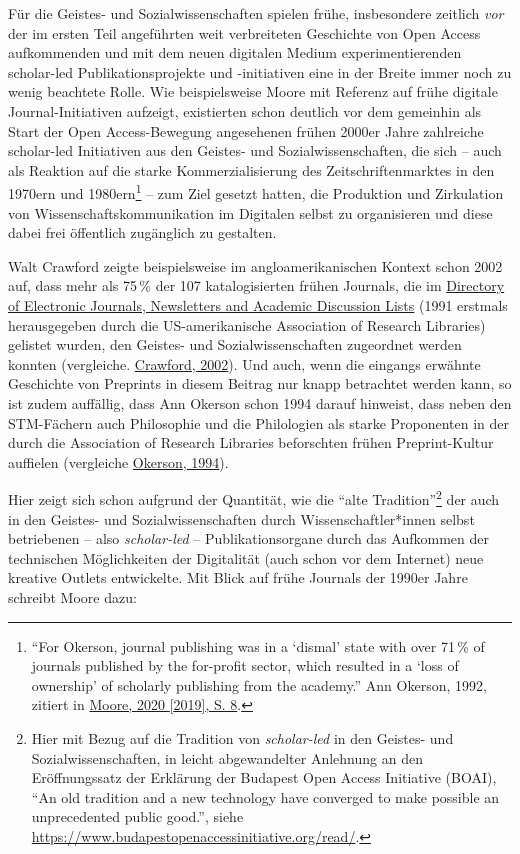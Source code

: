 \documentclass[a4paper,
fontsize=11pt,
oneside,
numbers=noperiodatend,
parskip=half-,
bibliography=totoc,
final
]{scrartcl}
\begin{document}
Für die Geistes- und Sozialwissenschaften spielen frühe, insbesondere
zeitlich \emph{vor} der im ersten Teil angeführten weit verbreiteten
Geschichte von Open Access aufkommenden und mit dem neuen digitalen
Medium experimentierenden scholar-led Publikationsprojekte und
-initiativen eine in der Breite immer noch zu wenig beachtete Rolle. Wie
beispielsweise Moore mit Referenz auf frühe digitale Journal-Initiativen
aufzeigt, existierten schon deutlich vor dem gemeinhin als Start der
Open Access-Bewegung angesehenen frühen 2000er Jahre zahlreiche
scholar-led Initiativen aus den Geistes- und Sozialwissenschaften, die
sich -- auch als Reaktion auf die starke Kommerzialisierung des
Zeitschriftenmarktes in den 1970ern und 1980ern\footnote{\enquote{For
  Okerson, journal publishing was in a \enquote*{dismal} state with over
  71\,\% of journals published by the for-profit sector, which resulted
  in a \enquote*{loss of ownership} of scholarly publishing from the
  academy.} Ann Okerson, 1992, zitiert in
  \href{https://doi.org/10.17613/41h8-j423}{Moore, 2020 {[}2019{]}, S.
  8}.} -- zum Ziel gesetzt hatten, die Produktion und Zirkulation von
Wissenschaftskommunikation im Digitalen selbst zu organisieren und diese
dabei frei öffentlich zugänglich zu gestalten.

Walt Crawford zeigte beispielsweise im angloamerikanischen Kontext schon
2002 auf, dass mehr als 75\,\% der 107 katalogisierten frühen Journals,
die im
\href{http://info.cern.ch/hypertext/DataSources/Journals.html}{Directory
of Electronic Journals, Newsletters and Academic Discussion Lists} (1991
erstmals herausgegeben durch die US-amerikanische Association of
Research Libraries) gelistet wurden, den Geistes- und
Sozialwissenschaften zugeordnet werden konnten (vergleiche.
\href{https://doi.org/10.1087/09531510252848881}{Crawford, 2002}). Und
auch, wenn die eingangs erwähnte Geschichte von Preprints in diesem
Beitrag nur knapp betrachtet werden kann, so ist zudem auffällig, dass
Ann Okerson schon 1994 darauf hinweist, dass neben den STM-Fächern auch
Philosophie und die Philologien als starke Proponenten in der durch die
Association of Research Libraries beforschten frühen Preprint-Kultur
auffielen (vergleiche \href{https://doi.org/10.7202/1064955ar}{Okerson,
1994}).

Hier zeigt sich schon aufgrund der Quantität, wie die \enquote{alte
Tradition}\footnote{Hier mit Bezug auf die Tradition von
  \emph{scholar-led} in den Geistes- und Sozialwissenschaften, in leicht
  abgewandelter Anlehnung an den Eröffnungssatz der Erklärung der
  Budapest Open Access Initiative (BOAI), \enquote{An old tradition and
  a new technology have converged to make possible an unprecedented
  public good.}, siehe
  \url{https://www.budapestopenaccessinitiative.org/read/}.} der auch in
den Geistes- und Sozialwissenschaften durch Wissenschaftler*innen selbst
betriebenen -- also \emph{scholar-led} -- Publikationsorgane durch das
Aufkommen der technischen Möglichkeiten der Digitalität (auch schon vor
dem Internet) neue kreative Outlets entwickelte. Mit Blick auf frühe
Journals der 1990er Jahre schreibt Moore dazu:
\end{document}
